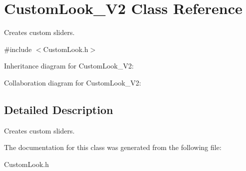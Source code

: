 \hypertarget{class_custom_look___v2}{}\section{Custom\+Look\+\_\+\+V2 Class Reference}
\label{class_custom_look___v2}


Creates custom sliders.  




{\ttfamily \#include $<$Custom\+Look.\+h$>$}



Inheritance diagram for Custom\+Look\+\_\+\+V2\+:


Collaboration diagram for Custom\+Look\+\_\+\+V2\+:


\subsection{Detailed Description}
Creates custom sliders. 

The documentation for this class was generated from the following file\+:\begin{DoxyCompactItemize}
\item 
Custom\+Look.\+h\end{DoxyCompactItemize}
